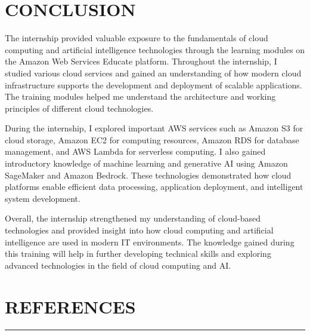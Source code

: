 \documentclass[12pt, a4paper, oneside]{report}
\begin{document}
\chapter{CONCLUSION}

The internship provided valuable exposure to the fundamentals of cloud computing and 
artificial intelligence technologies through the learning modules on the Amazon Web 
Services Educate platform. Throughout the internship, I studied various cloud services 
and gained an understanding of how modern cloud infrastructure supports the 
development and deployment of scalable applications. The training modules helped me 
understand the architecture and working principles of different cloud technologies.

During the internship, I explored important AWS services such as Amazon S3 for cloud 
storage, Amazon EC2 for computing resources, Amazon RDS for database management, 
and AWS Lambda for serverless computing. I also gained introductory knowledge of 
machine learning and generative AI using Amazon SageMaker and Amazon Bedrock. 
These technologies demonstrated how cloud platforms enable efficient data processing, 
application deployment, and intelligent system development.

Overall, the internship strengthened my understanding of cloud-based technologies and 
provided insight into how cloud computing and artificial intelligence are used in modern 
IT environments. The knowledge gained during this training will help in further 
developing technical skills and exploring advanced technologies in the field of cloud 
computing and AI.


\chapter*{\vspace{-1cm}REFERENCES}
\thispagestyle{fancy}

\begin{center}
    \rule{\linewidth}{0.4pt}
\end{center}

\vspace{0.4cm}
\end{document}
